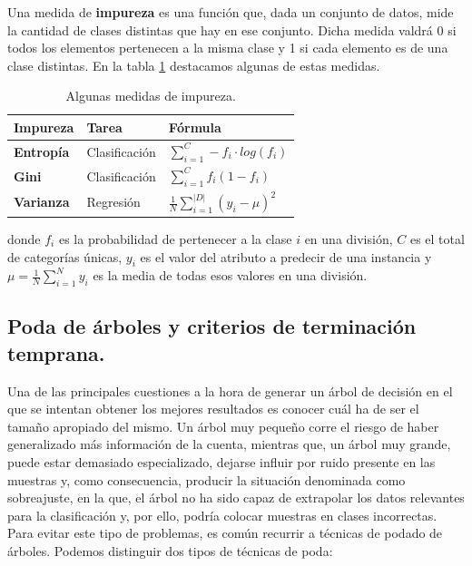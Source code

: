 Una medida de \textbf{impureza} \cite{impurity} es una función que, dada un conjunto de datos, mide la cantidad de clases distintas que hay en ese conjunto. Dicha medida valdrá 0 si todos los elementos pertenecen a la misma clase y 1 si cada elemento es de una clase distintas. En la tabla \ref{tab:entropy} destacamos algunas de estas medidas.\\

\begin{table}[ht]
\centering
\begin{tabular}{|l|l|l|}
\hline
\textbf{Impureza} & \textbf{Tarea} & \textbf{Fórmula}                         \\ \hline
\textbf{Entropía}  & Clasificación  & $\sum_{i=1}^{C}- f_i \cdot log (f_i)$    \\ \hline
\textbf{Gini}      & Clasificación  & $\sum_{i=1}^{C} f_i (1 - f_i)$           \\ \hline
\textbf{Varianza}  & Regresión      & $\frac{1}{N}\sum_{i=1}^|D|(y_i - \mu)^2$ \\ \hline
\end{tabular}
\caption{Algunas medidas de impureza.}
\label{tab:entropy}
\end{table}

donde $f_i$ es la probabilidad de pertenecer a la clase $i$ en una división, $C$ es el total de categorías únicas, $y_i$ es el valor del atributo a predecir de una instancia  y $\mu = \frac{1}{N} \sum_{i=1}^{N}y_i$ es la media de todas esos valores en una división.\\
\subsection{Poda de árboles y criterios de terminación temprana.}
Una de las principales cuestiones a la hora de generar un árbol de decisión en el que se intentan obtener los mejores resultados es conocer cuál ha de ser el tamaño apropiado del mismo. Un árbol muy pequeño corre el riesgo de haber generalizado más información de la cuenta, mientras que, un árbol muy grande, puede estar demasiado especializado, dejarse influir por ruido presente en las muestras y, como consecuencia, producir la situación denominada como sobreajuste, en la que, el árbol no ha sido capaz de extrapolar los datos relevantes para la clasificación y, por ello, podría colocar muestras en clases incorrectas.\\

Para evitar este tipo de problemas, es común recurrir a técnicas de podado de árboles. Podemos distinguir dos tipos de técnicas de poda:\\

